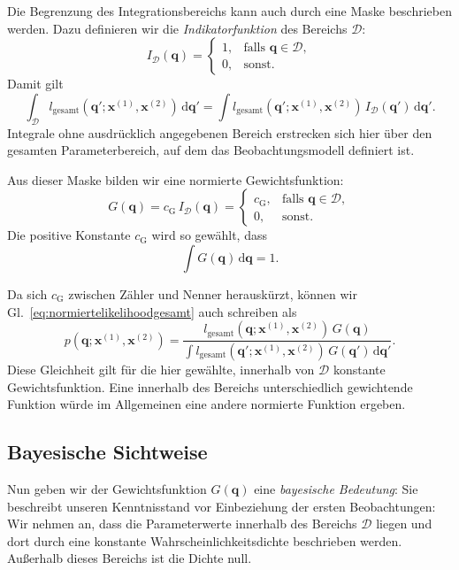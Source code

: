 Die Begrenzung des Integrationsbereichs kann auch durch
eine Maske beschrieben werden. Dazu definieren wir
die \textsl{Indikatorfunktion} des Bereichs $\mathcal D$:
\[
I_{\mathcal D}(\mathbf q)
=
\begin{cases}
1,&\text{falls }\mathbf q\in\mathcal D,\\
0,&\text{sonst}.
\end{cases}
\]
Damit gilt
\[
\int_{\mathcal D}
l_{\mathrm{gesamt}}(\mathbf q';\mathbf x^{(1)},\mathbf x^{(2)})
\,\mathrm d\mathbf q'
=
\int
l_{\mathrm{gesamt}}(\mathbf q';\mathbf x^{(1)},\mathbf x^{(2)})
\,I_{\mathcal D}(\mathbf q')\,\mathrm d\mathbf q'.
\]
Integrale ohne ausdrücklich angegebenen Bereich erstrecken
sich hier über den gesamten Parameterbereich, auf dem das
Beobachtungsmodell definiert ist.

Aus dieser Maske bilden wir eine normierte Gewichtsfunktion:
\[
G(\mathbf q)
=
c_{\mathrm G}\,I_{\mathcal D}(\mathbf q)
=
\begin{cases}
c_{\mathrm G},&\text{falls }\mathbf q\in\mathcal D,\\
0,&\text{sonst}.
\end{cases}
\]
Die positive Konstante $c_{\mathrm G}$ wird so gewählt, dass
\[
\int G(\mathbf q)\,\mathrm d\mathbf q=1.
\]

Da sich $c_{\mathrm G}$ zwischen Zähler und Nenner herauskürzt,
können wir Gl.~\eqref{eq:normiertelikelihoodgesamt} auch schreiben als
\begin{equation}
p(\mathbf q;\mathbf x^{(1)},\mathbf x^{(2)})
=
\frac{
l_{\mathrm{gesamt}}(\mathbf q;\mathbf x^{(1)},\mathbf x^{(2)})
\,G(\mathbf q)
}{
\displaystyle\int
l_{\mathrm{gesamt}}(\mathbf q';\mathbf x^{(1)},\mathbf x^{(2)})
\,G(\mathbf q')\,\mathrm d\mathbf q'
}.
\label{eq:normiertelikelihoodgesamtG}
\end{equation}
Diese Gleichheit gilt für die hier gewählte, innerhalb von
$\mathcal D$ konstante Gewichtsfunktion. Eine innerhalb des
Bereichs unterschiedlich gewichtende Funktion würde im
Allgemeinen eine andere normierte Funktion ergeben.

\subsection{Bayesische Sichtweise}

Nun geben wir der Gewichtsfunktion $G(\mathbf q)$ eine \textsl{bayesische Bedeutung}:
Sie beschreibt unseren
Kenntnisstand vor Einbeziehung der ersten Beobachtungen:
Wir nehmen an, dass die Parameterwerte innerhalb des Bereichs
$\mathcal D$ liegen und dort durch eine konstante
Wahrscheinlichkeitsdichte beschrieben werden.
Außerhalb dieses Bereichs ist die Dichte null.

